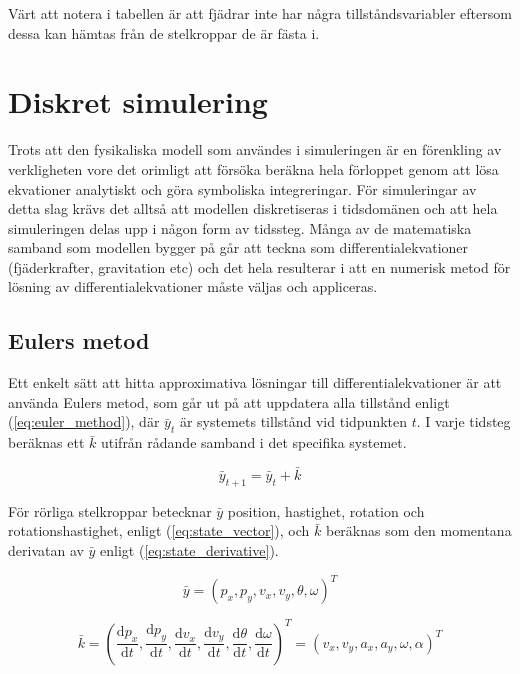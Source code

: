 \documentclass[a4paper,12pt,twopage,swedish]{article}
\begin{document}
Värt att notera i tabellen är att fjädrar inte har några tillståndsvariabler eftersom dessa kan hämtas från de stelkroppar de är fästa i.


\section{Diskret simulering}
Trots att den fysikaliska modell som användes i simuleringen är en förenkling av verkligheten vore det orimligt att försöka beräkna hela förloppet genom att lösa ekvationer analytiskt och göra symboliska integreringar. För simuleringar av detta slag krävs det alltså att modellen diskretiseras i tidsdomänen och att hela simuleringen delas upp i någon form av tidssteg. Många av de matematiska samband som modellen bygger på går att teckna som differentialekvationer (fjäderkrafter, gravitation etc) och det hela resulterar i att en numerisk metod för lösning av differentialekvationer måste väljas och appliceras.

\subsection{Eulers metod}
Ett enkelt sätt att hitta approximativa lösningar till differentialekvationer är att använda Eulers metod, som går ut på att uppdatera alla tillstånd enligt (\ref{eq:euler_method}), där $\bar{y}_t$ är systemets tillstånd vid tidpunkten $t$. I varje tidsteg beräknas ett $\bar{k}$ utifrån rådande samband i det specifika systemet.

\begin{equation}\label{eq:euler_method}
\bar{y}_{t+1} = \bar{y}_t + \bar{k}
\end{equation}

För rörliga stelkroppar betecknar $\bar{y}$ position, hastighet, rotation och rotationshastighet, enligt (\ref{eq:state_vector}), och $\bar{k}$ beräknas som den momentana derivatan av $\bar{y}$ enligt (\ref{eq:state_derivative}).

\begin{equation}\label{eq:state_vector}
\bar{y} = (p_x, p_y, v_x, v_y, \theta, \omega)^T
\end{equation}

\begin{equation}\label{eq:state_derivative}
\bar{k} = \left( \frac{\mathrm{d}p_x}{\mathrm{d}t}, \frac{\mathrm{d}p_y}{\mathrm{d}t}, \frac{\mathrm{d}v_x}{\mathrm{d}t}, \frac{\mathrm{d}v_y}{\mathrm{d}t}, \frac{\mathrm{d}\theta}{\mathrm{d}t}, \frac{\mathrm{d}\omega}{\mathrm{d}t} \right) ^T = (v_x, v_y, a_x, a_y, \omega, \alpha)^T
\end{equation}
\end{document}
